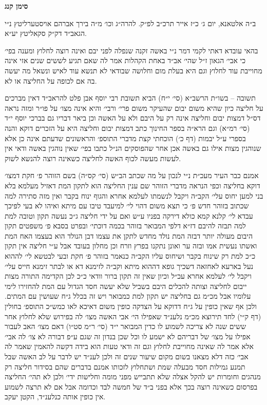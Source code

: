 \documentclass[12pt, openany]{book}
\newcommand{\chapname}{}
\newcommand{\newchap}[1]{
	\addcontentsline{toc}{chapter}{#1}
	\renewcommand{\chapname}{#1}
		\begin{center}
			\textbf{%
\fontsize{16pt}{16pt}\selectfont
				#1}
		\end{center}
}
\begin{document}
\newchap{סימן קנג}
\begin{multicols}{2}
ב״ה אלטאנא, יום ג׳ כ״ז אייר תרכ״ב לפ״ק. להרה״ג וכו׳ מ״ה בירך אברהם אויסטערליטץ נ״י הגאב״ד דק״ק סקאליטץ יע״א.\\\vspace{0pt}

בהאי עובדא דאתי לקמי דמר נ״י באשה זקנה שנפלה לפני יבם ואינה רוצה לחלוץ ומענה בפי׳ כי אבי׳ הגאון ז״ל שהי׳ אב״ד באחת הקהלות אמר לה שאם תגיע לששים שנים אזי אינה מחוייבת עוד לחלוץ וגם היא בעלת מום וחלושה שבודאי לא תנשא עוד לאיש ונשאל מה יעשה בה אם לכופה על החליצה או לא.\\\vspace{0pt}

תשובה – בשו״ת הרשב״א (סי׳ י״ח) הביא תשובת רבי יוסף אבן פלט להראב״ד דאין מברכים על חליצה כיון שהיא משום יבום שהעיקר משום פרי׳ ורבי׳ והיא אינה מצו׳ על פו״ר ומזה נראה דס״ל דמצות יבום וחליצה אינה רק על היבם ולא על האשה וכן ביאר דבריו גם בברכי יוסף י״ד (סי׳ רמ״א) וגם הרא״ה בספר החינוך כתב דמצות יבום וחליצה היא על הזכרים דוקא והנה בספרי ע״ל יבמות (דף כ׳) הוכחתי קצת מדברי התוספ׳ והראשונים שדעתם אינה כן אלא שנוהגין מצות אילו גם באשה אכן אחר שהפוסקים הנ״ל כתבו בפי׳ שאין נוהגין באשה ודאי אין לעשות מעשה לכוף האשה לחליצה כשאינה רוצה להנשא לשוק.\\\vspace{0pt}

אמנם כבר העיר מעכ״ת נ״י לנכון על מה שכתב הב״ש (סי׳ קס״ה) בשם הזוהר פ׳ חקת דמצו׳ דוקא בחליצה וכפי הנראה מדברי הזוהר שם ענין החליצה הוא לתקון המת דאזיל מעלמא בלא בני למען יחוס עלי׳ הקב״ה ויקבל לנשמתו לעלמא אחרא והגוף ינוח בקבר ואין מזה סתירה למה שכתוב בזוהר חדש פ׳ כי תצא משום דהוי לי׳ למיעבד טיבו עם מיתא ואיהו לא בעי לפיכך עבדא לי׳ קלנא קמא כולא דירקה בפניו ע״ש ואם על ידי חליצה ג״כ נעשה תקון וטובה למת למה תבזה להיבם דז״א דלפי המבואר בזוהר בכמה דוכתי׳ ובפרט בסבא פ׳ משפטים תקון היבום מעולה יותר דבזה המת נולד מחדש לתקן את עצמו דבן הנולד הוא בעצמו האח המת ואשתו נעשית אמו ובזה ער ואונן נתקנו בפרץ וזרח וכן מחלון בעובד אבל ע״י חליצה אין תקון כ״כ למת רק שינוח בקבר ושיחוס עליו הקב״ה כנאמר בזוהר פ׳ חקת ובעי לבטשא לי׳ לההוא נעל בארעא לאחזאה דשכיך גופא דההוא מיתא וקב״ה לזימנא דא או לבתר זימנא חייס עלי׳ ויקבל לי׳ לעלמא אחרא עכ״ל וכיון שאין זה תקון ברור וודאי כ״כ לכן הקדימה התורה מצות ייבום לחליצה וצותה להכלים היבם בשביל שלא יעשה חסד הגדול עם המת להחזירו לימי עלומיו אבל מכ״מ גם בחליצה יש תקון למת כמבואר ויש זה בכלל ג״ח שעושין עם המתים. ולכן אף שאין כופין על ג״ח דדוקא על הצדקה כופין משום דאיכא לאו כמש״כ התוספ׳ בחולין (דף ק״י) לחד תירוצא מכ״מ נלענ״ד שאפילו הי׳ אבי האשה מצו׳ לה בפירוש שלא לחלוץ אחר ששים שנה לא צריכה לשמוע לו כדין המבואר י״ד (סי׳ ר״מ סט״ו) דאם מצו׳ האב לעבור אפילו על מצו׳ של דבריהם לא ישמע לו וכל שכן בנדון זה שגם ע״פ דבורה לא צו׳ לה אבי׳ אלא אמר לה שאינה מחוייבת לחלוץ וגם זה ודאי טעות הוא בידה דקשה להאמין שאמר לה אבי׳ כזה דלא מצאנו בשום מקום שיעור שנים זה ולכן לענ״ד יש לדבר על לב האשה שבל תמנע גמילות חסד מבעלה שמת ושתחלוץ לזכותו אמנם בדברים שהם בסידור חליצה רק מנהגים וחומרות יש להקל אצלה שלא תתבייש מפני מומה וחלישות ידי׳ ולכן לא תהי׳ החליצה בפרסום כשאינה רוצה בכך אלא בפני ב״ד של חמשה לבד וכדומה אבל אם לא תרצה לשמוע אין כופין אותה כנלענ״ד, הקטן יעקב.\\\vspace{0pt}


\end{multicols}
\end{document}
